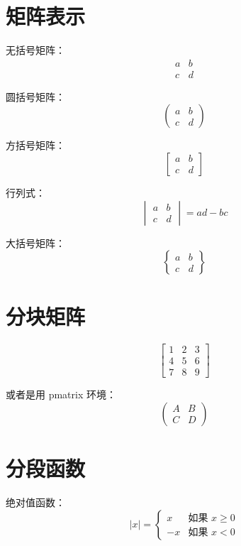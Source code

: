 \documentclass[a4paper,fontsize=8pt]{kaobook}
\begin{document}
\section{矩阵表示}

无括号矩阵：
\[
\begin{matrix}
    a & b \\
    c & d
\end{matrix}
\]

圆括号矩阵：
\[
\begin{pmatrix}
    a & b \\
    c & d
\end{pmatrix}
\]

方括号矩阵：
\[
\begin{bmatrix}
    a & b \\
    c & d  
\end{bmatrix}
\]


行列式：
\[
\begin{vmatrix}
    a & b \\
    c & d
\end{vmatrix}
= ad - bc
\]

大括号矩阵：
\[
\begin{Bmatrix}
    a & b \\
    c & d
\end{Bmatrix}
\]


\section{分块矩阵}
\[
\left[
\begin{array}{cc|c}
    1 & 2 & 3 \\
    4 & 5 & 6 \\
    \hline
    7 & 8 & 9
\end{array}
\right]
\]


或者是用 pmatrix 环境：
\[
\begin{pmatrix}
    A & B \\
    C & D  
\end{pmatrix}
\]



\section{分段函数}

绝对值函数：
\[
|x| = 
\begin{cases}
    x & \text{如果 } x \geq 0 \\
    -x & \text{如果 } x < 0
\end{cases}
\]
\end{document}
